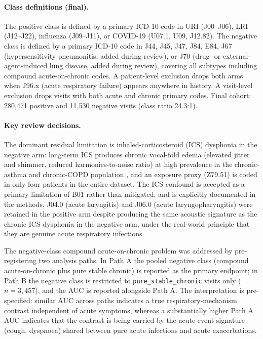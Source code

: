 \documentclass[utf8]{frontiers_suppmat} %
\begin{document}
\paragraph{Class definitions (final).} The positive class is defined
by a primary ICD-10 code in URI (J00--J06), LRI (J12--J22), influenza
(J09--J11), or COVID-19 (U07.1, U09, J12.82). The negative
class is defined by a primary ICD-10 code in J44, J45, J47, J84, E84,
J67 (hypersensitivity pneumonitis, added during review), or J70
(drug- or external-agent-induced lung disease, added during review),
covering all subtypes including compound acute-on-chronic codes.
A patient-level exclusion drops both arms when J96.x (acute respiratory
failure) appears anywhere in history. A visit-level exclusion drops
visits with both acute and chronic primary codes. Final cohort:
280{,}471 positive and 11{,}530 negative visits (class ratio 24.3:1).

\paragraph{Key review decisions.} The dominant residual limitation is
inhaled-corticosteroid (ICS) dysphonia in the negative arm: long-term
ICS produces chronic vocal-fold edema (elevated jitter and shimmer,
reduced harmonics-to-noise ratio) at high prevalence in the chronic-asthma
and chronic-COPD population \citep{ics-dysphonia-laryngeal-deposition}, and an exposure proxy (Z79.51) is coded
in only four patients in the entire dataset. The ICS confound is
accepted as a primary limitation of B01 rather than mitigated, and is
explicitly documented in the methods. J04.0 (acute laryngitis) and
J06.0 (acute laryngopharyngitis) were retained in the positive arm
despite producing the same acoustic signature as the chronic ICS
dysphonia in the negative arm, under the real-world principle that
they are genuine acute respiratory infections.

The negative-class compound acute-on-chronic problem was addressed by
pre-registering two analysis paths. In Path A the pooled negative
class (compound acute-on-chronic plus pure stable chronic) is reported
as the primary endpoint; in Path B the negative class is restricted
to \texttt{pure\_stable\_chronic} visits only ($n=3{,}457$), and the
AUC is reported alongside Path A. The interpretation is pre-specified:
similar AUC across paths indicates a true respiratory-mechanism
contrast independent of acute symptoms, whereas a substantially higher
Path A AUC indicates that the contrast is being carried by the
acute-event signature (cough, dyspnoea) shared between pure acute
infections and acute exacerbations.
\end{document}
